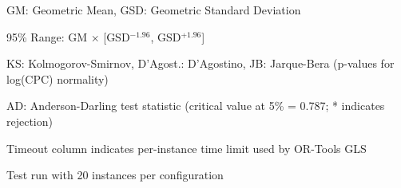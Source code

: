 \begin{table*}[htbp]
\begin{tabular}{@{}l c c c S[table-format=1.4] S[table-format=1.4] c c c c c c@{}}
\bottomrule
\end{tabular}
\begin{tablenotes}
\small
\item GM: Geometric Mean, GSD: Geometric Standard Deviation
\item 95\% Range: GM $\times$ [GSD$^{-1.96}$, GSD$^{+1.96}$]
\item KS: Kolmogorov-Smirnov, D'Agost.: D'Agostino, JB: Jarque-Bera (p-values for log(CPC) normality)
\item AD: Anderson-Darling test statistic (critical value at 5\% = 0.787; * indicates rejection)
\item Timeout column indicates per-instance time limit used by OR-Tools GLS
\item Test run with 20 instances per configuration
\end{tablenotes}
\end{table*}